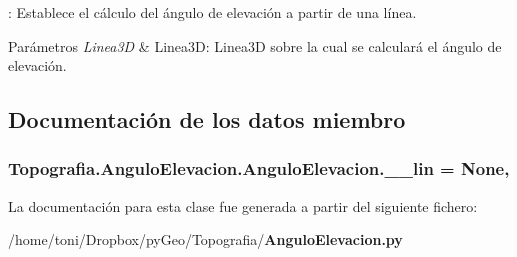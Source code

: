 \-: Establece el cálculo del ángulo de elevación a partir de una línea. 


\begin{DoxyParams}{Parámetros}
{\em Linea3\-D} & Linea3\-D\-: Linea3\-D sobre la cual se calculará el ángulo de elevación. \\
\hline
\end{DoxyParams}


\subsection{Documentación de los datos miembro}
\subsubsection[{\-\_\-\-\_\-lin}]{\setlength{\rightskip}{0pt plus 5cm}Topografia.\-Angulo\-Elevacion.\-Angulo\-Elevacion.\-\_\-\-\_\-lin = None\hspace{0.3cm}{\ttfamily [static]}, {\ttfamily [private]}}\label{classTopografia_1_1AnguloElevacion_1_1AnguloElevacion_a0c6dda03c6ec9410ed0d938e65d71c6e}


La documentación para esta clase fue generada a partir del siguiente fichero\-:\begin{DoxyCompactItemize}
\item 
/home/toni/\-Dropbox/py\-Geo/\-Topografia/{\bf Angulo\-Elevacion.\-py}\end{DoxyCompactItemize}
